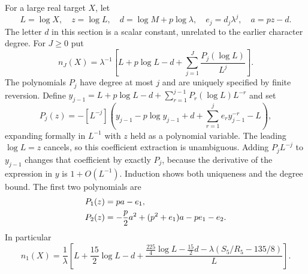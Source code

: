 \documentclass[11pt,letterpaper]{article}
\theoremstyle{remark}\newtheorem{remark}[theorem]{Remark}
\numberwithin{equation}{section}
\begin{document}
For a large real target $X$, let
\begin{equation}\label{upo:all5:eq:inverse-notation}
 L=\log X,\quad z=\log L,\quad
 d=\log M+p\log\lambda,\quad e_j=d_j\lambda^j,\quad a=pz-d.
\end{equation}
The letter $d$ in this section is a scalar constant, unrelated to
the earlier character degree. For $J\ge0$ put
\begin{equation}\label{upo:all5:eq:nJ}
 n_J(X)=\lambda^{-1}
 \left[L+p\log L-d+\sum_{j=1}^J\frac{P_j(\log L)}{L^j}\right].
\end{equation}
The polynomials $P_j$ have degree at most $j$ and are uniquely
specified by finite reversion. Define
$y_{j-1}=L+p\log L-d+\sum_{r=1}^{j-1}P_r(\log L)L^{-r}$ and set
\begin{equation}\label{upo:all5:eq:P-recursion}
 P_j(z)=-[L^{-j}]
 \left(y_{j-1}-p\log y_{j-1}+d
                    +\sum_{r=1}^j e_r y_{j-1}^{-r}-L\right),
\end{equation}
expanding formally in $L^{-1}$ with $z$ held as a polynomial
variable. The leading $\log L=z$ cancels, so this coefficient
extraction is unambiguous. Adding $P_jL^{-j}$ to $y_{j-1}$ changes
that coefficient by exactly $P_j$, because the derivative of the
expression in $y$ is $1+O(L^{-1})$. Induction shows both uniqueness
and the degree bound. The first two polynomials are
\begin{align}\label{upo:all5:eq:P12}
 P_1(z)&=pa-e_1,\notag\\
 P_2(z)&=-\frac p2a^2+(p^2+e_1)a-pe_1-e_2.
\end{align}
In particular
\begin{equation}\label{upo:all5:eq:n1}
 n_1(X)=\frac1\lambda\left[
 L+\frac{15}{2}\log L-d+
 \frac{\tfrac{225}{4}\log L-\tfrac{15}{2}d
                    -\lambda(S_5/R_5-135/8)}{L}\right].
\end{equation}
\end{document}
